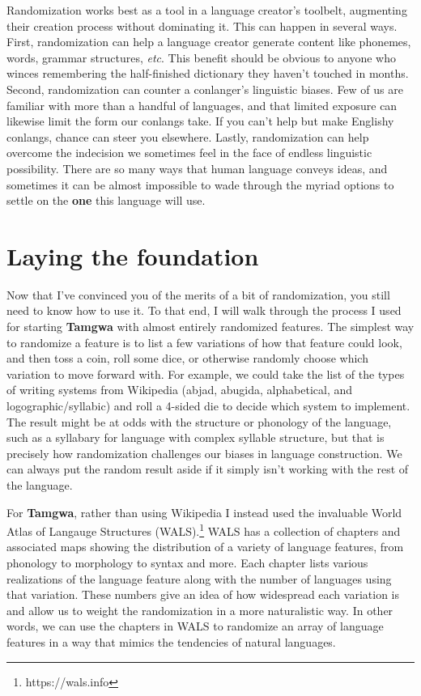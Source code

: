 \documentclass[a4paper,12pt,twoside,openright]{memoir}
\begin{document}
    Randomization works best as a tool in a language creator's toolbelt, augmenting their creation process without dominating it.  This can happen in several ways.  First, randomization can help a language creator generate content like phonemes, words, grammar structures, \textit{etc}.  This benefit should be obvious to anyone who winces remembering the half-finished dictionary they haven't touched in months. Second, randomization can counter a conlanger's linguistic biases.  Few of us are familiar with more than a handful of languages, and that limited exposure can likewise limit the form our conlangs take.  If you can't help but make Englishy conlangs, chance can steer you elsewhere.  Lastly, randomization can help overcome the indecision we sometimes feel in the face of endless linguistic possibility.  There are so many ways that human language conveys ideas, and sometimes it can be almost impossible to wade through the myriad options to settle on the \textbf{one} this language will use.

\section*{Laying the foundation} %

    Now that I've convinced you of the merits of a bit of randomization, you still need to know how to use it.  To that end, I will walk through the process I used for starting \textbf{Tamgwa} with almost entirely randomized features.  The simplest way to randomize a feature is to list a few variations of how that feature could look, and then toss a coin, roll some dice, or otherwise randomly choose which variation to move forward with.  For example, we could take the list of the types of writing systems from Wikipedia (abjad, abugida, alphabetical, and logographic/syllabic) and roll a 4-sided die to decide which system to implement.  The result might be at odds with the structure or phonology of the language, such as a syllabary for language with complex syllable structure, but that is precisely how randomization challenges our biases in language construction.  We can always put the random result aside if it simply isn't working with the rest of the language.

    For \textbf{Tamgwa}, rather than using Wikipedia I instead used the invaluable World Atlas of Langauge Structures (WALS).\footnote{https://wals.info}  WALS has a collection of chapters and associated maps showing the distribution of a variety of language features, from phonology to morphology to syntax and more.  Each chapter lists various realizations of the language feature along with the number of languages using that variation.  These numbers give an idea of how widespread each variation is and allow us to weight the randomization in a more naturalistic way.  In other words, we can use the chapters in WALS to randomize an array of language features in a way that mimics the tendencies of natural languages.
\end{document}
